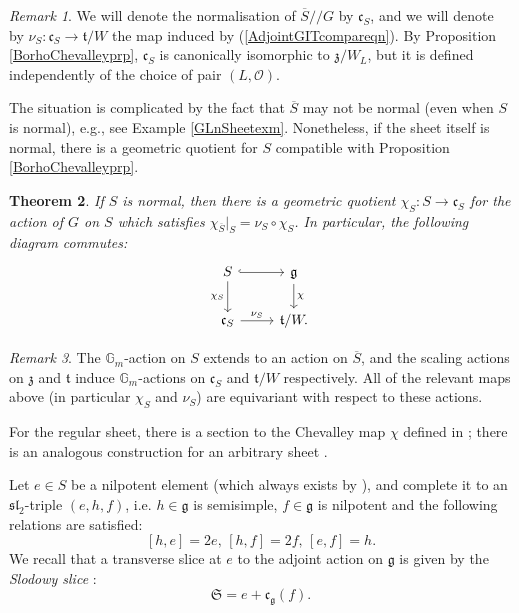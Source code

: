 \documentclass{amsart}
\newtheorem{theorem}{Theorem}
\theoremstyle{remark}
\newtheorem{remark}[theorem]{Remark}
\numberwithin{theorem}{section}
\numberwithin{equation}{section}
\begin{document}
\begin{remark}\label{GeometricQuotientrmk}
	We will denote the normalisation of $\overline{S}//G$ by $\mathfrak{c}_S$, and we will denote by $\nu_S:\mathfrak{c}_S \rightarrow \mathfrak{t}/W$ the map induced by (\ref{AdjointGITcompareqn}). By Proposition \ref{BorhoChevalleyprp}, $\mathfrak{c}_S$ is canonically isomorphic to $\mathfrak{z}/W_L$, but it is defined independently of the choice of pair $(L,\mathcal O)$.
\end{remark}

The situation is complicated by the fact that $\overline{S}$ may not be normal (even when $S$ is normal), e.g., see Example \ref{GLnSheetexm}. Nonetheless, if the sheet itself is normal, there is a geometric quotient for $S$ compatible with Proposition \ref{BorhoChevalleyprp}.

\begin{theorem}\label{BCGeometricQthm}\cite[Theorem 6.5]{Borho2}
    If $S$ is normal, then there is a geometric quotient $\chi_S:S \rightarrow \mathfrak{c}_S$ for the action of $G$ on $S$ which satisfies $\chi_{\overline{S}}|_S = \nu_S \circ \chi_S$. In particular, the following diagram commutes:
    \begin{equation}\label{BCGeometricQ1eqn}
        \begin{tikzcd}
            S \arrow[d, "\chi_{S}"'] \arrow[r, hook] & \mathfrak{g} \arrow[d, "\chi"] \\
            \mathfrak{c}_S \arrow[r, "\nu_S"]         & \mathfrak{t}/W.                
        \end{tikzcd}
    \end{equation}
\end{theorem}

\begin{remark}\label{BCEquivariancermk}
    The $\mathbb{G}_m$-action on $S$ extends to an action on $\overline{S}$, and the scaling actions on $\mathfrak{z}$ and $\mathfrak{t}$ induce $\mathbb{G}_m$-actions on $\mathfrak{c}_S$ and $\mathfrak{t}/W$ respectively. All of the relevant maps above (in particular $\chi_S$ and $\nu_S$) are equivariant with respect to these actions.
\end{remark}

For the regular sheet, there is a section to the Chevalley map $\chi$ defined in \cite{Kostant}; there is an analogous construction for an arbitrary sheet \cite{Katsylo}.

Let $e \in S$ be a nilpotent element (which always exists by \cite[Korollar 3.2]{BK}), and complete it to an $\mathfrak{sl}_2$-triple $(e,h,f)$, i.e. $h \in \mathfrak {g}$ is semisimple, $f \in \mathfrak{g}$ is nilpotent and the following relations are satisfied:
\begin{equation}\label{SL2Tripleeqn}
    [h,e] = 2e, \, [h,f] = 2f, \, [e,f] = h.
\end{equation}
We recall that a transverse slice at $e$ to the adjoint action on $\mathfrak{g}$ is given by the \emph{Slodowy slice} \cite[Section 7.4]{Slodowy}:
    \begin{equation}\label{SlodowySliceeqn}
        \mathfrak{S}= e+\mathfrak{c}_{\mathfrak{g}}(f).
    \end{equation}
\end{document}
